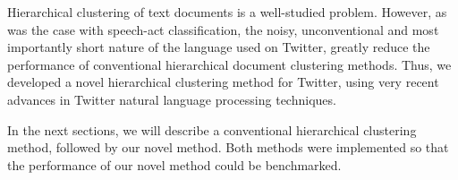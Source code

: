 \documentclass[letterpaper]{article}
\begin{document}



Hierarchical clustering of text documents is a well-studied problem. However, as was the case with speech-act classification, the noisy, unconventional and most importantly short nature of the language used on Twitter, greatly reduce the performance of conventional hierarchical document clustering methods. Thus, we developed a novel hierarchical clustering method for Twitter, using very recent advances in Twitter natural language processing techniques. 

In the next sections, we will describe a conventional hierarchical clustering method, followed by our novel method. Both methods were implemented so that the performance of our novel method could be benchmarked. 


\end{document}
